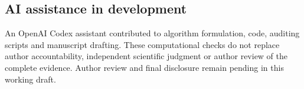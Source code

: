 

\subsection{AI assistance in development}
An OpenAI Codex assistant contributed to algorithm formulation, code, auditing
scripts and manuscript drafting. These computational checks do not replace
author accountability, independent scientific judgment or author review of
the complete evidence. Author review and final disclosure remain pending in
this working draft.
